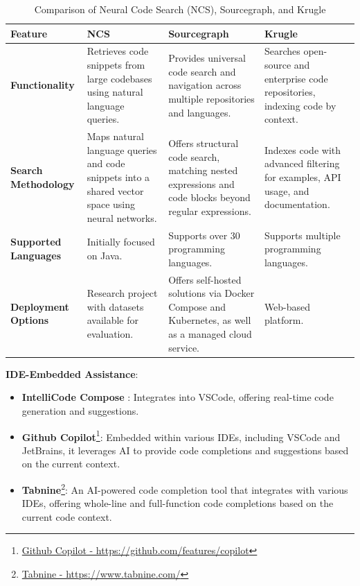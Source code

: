     \begin{table}[h!]
    \centering
    \begin{tabular}{p{3cm}p{4cm}p{4cm}p{4cm}}
    \hline
    \textbf{Feature} & \textbf{NCS} & \textbf{Sourcegraph} & \textbf{Krugle} \\ \hline
    
    \textbf{Functionality}
    & Retrieves code snippets from large codebases using natural language queries.
    & Provides universal code search and navigation across multiple repositories and languages.
    & Searches open-source and enterprise code repositories, indexing code by context. \\ \hline
    
    \textbf{Search Methodology}
    & Maps natural language queries and code snippets into a shared vector space using neural networks.
    & Offers structural code search, matching nested expressions and code blocks beyond regular expressions.
    & Indexes code with advanced filtering for examples, API usage, and documentation. \\ \hline
    
    \textbf{Supported Languages}
    & Initially focused on Java.
    & Supports over 30 programming languages.
    & Supports multiple programming languages. \\ \hline
    
    \textbf{Deployment Options}
    & Research project with datasets available for evaluation.
    & Offers self-hosted solutions via Docker Compose and Kubernetes, as well as a managed cloud service.
    & Web-based platform. \\ \hline
    
    \end{tabular}
    \caption{Comparison of Neural Code Search (NCS), Sourcegraph, and Krugle}
    \end{table}

\textbf{IDE-Embedded Assistance}:
    \begin{itemize}
        \item \textbf{IntelliCode Compose} \cite{svyatkovskiy2020}: Integrates into VSCode, offering real-time code generation and suggestions.
        \item \textbf{Github Copilot}\footnote{\href{https://github.com/features/copilot}{Github Copilot - https://github.com/features/copilot}}: Embedded within various IDEs, including VSCode and JetBrains, it leverages AI to provide code completions and suggestions based on the current context.
        \item \textbf{Tabnine}\footnote{\href{https://www.tabnine.com/}{Tabnine - https://www.tabnine.com/}}: An AI-powered code completion tool that integrates with various IDEs, offering whole-line and full-function code completions based on the current code context.
    \end{itemize}

